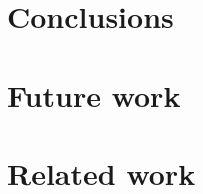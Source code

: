 \documentclass[12pt, oneside]{book}
\begin{document}
\chapter{Conclusions}

\chapter{Future work}


\chapter{Related work}


\clearpage


\end{document}
